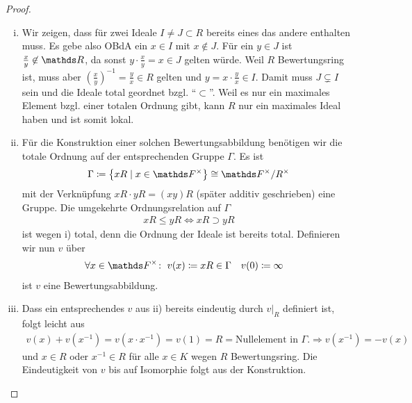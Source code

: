 \documentclass[ngerman,fontsize=11pt, paper=a4, parskip=half, titlepage=true, toc=bib]{scrartcl}
\begin{document}
\begin{Lem}
  \begin{proof}
    \begin{enumerate}[i)]
    \item Wir zeigen, dass für zwei Ideale $I\neq J\subset R$ bereits
      eines das andere enthalten muss. Es gebe also OBdA ein $x\in I$
      mit $x\not\in J$. Für ein $y\in J$ ist $\frac{x}{y}\not\in\R$,
      da sonst $y\cdot \frac{x}{y}=x\in J$ gelten würde.
      Weil $R$ Bewertungsring ist, muss aber
      $(\frac{x}{y})^{-1}=\frac{y}{x}\in R$ gelten und $y=x\cdot
      \frac{y}{x}\in I$. Damit muss $J\subsetneq I$ sein und die
      Ideale total geordnet bzgl. \enquote{$\subset$}.
      Weil es nur ein maximales Element bzgl. einer totalen Ordnung
      gibt, kann $R$ nur ein maximales Ideal haben und ist somit
      lokal.
    \item Für die Konstruktion einer solchen Bewertungsabbildung
      benötigen wir die totale Ordnung auf der entsprechenden Gruppe $\Gamma$.
      Es ist
      \begin{gather*}
        \Gamma \coloneqq \left\{ xR \mid x\in \Fx \right\}\cong\Fx/R^{\times}
      \end{gather*}
      mit der Verknüpfung $xR\cdot yR=(xy)R$ (später additiv
      geschrieben) eine Gruppe. Die umgekehrte Ordnungsrelation
      auf $\Gamma$
      \begin{gather*}
        xR\leq yR \Longleftrightarrow xR \supset yR
      \end{gather*}
      ist wegen i) total, denn die Ordnung der Ideale ist bereits total.
      Definieren wir nun $v$ über
      \begin{align*}
        \forall x\in \Fx\colon\;v(x)&\coloneqq xR\in\Gamma
        &v(0)&\coloneqq \infty
      \end{align*}
      ist $v$ eine Bewertungsabbildung. 
    \item Dass ein entsprechendes $v$ aus ii) bereits eindeutig
      durch $v|_{R}$ definiert ist, folgt leicht aus
      \begin{gather*}
        v(x)+v(x^{-1}) = v(x\cdot x^{-1}) = v(1) = R  =
        \text{Nullelement in }\Gamma.
        \Longrightarrow v(x^{-1})=-v(x)
      \end{gather*}
      und $x\in R$ oder $x^{-1}\in R$ für alle $x\in K$ wegen $R$
      Bewertungsring.
      Die Eindeutigkeit von $v$ bis auf Isomorphie folgt aus der
      Konstruktion.
    \end{enumerate}
  \end{proof}
\end{Lem}
\end{document}
